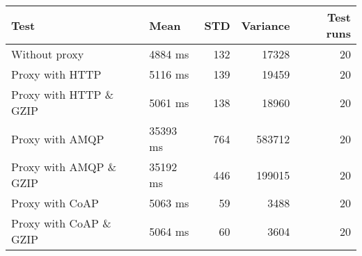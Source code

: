 \begin{tabularx}{\textwidth}{llrrr}
\hline
 Test                   & Mean     &   STD &   Variance &   Test runs \\
\hline
 Without proxy          & 4884 ms  &   132 &      17328 &          20 \\
 Proxy with HTTP        & 5116 ms  &   139 &      19459 &          20 \\
 Proxy with HTTP \& GZIP & 5061 ms  &   138 &      18960 &          20 \\
 Proxy with AMQP        & 35393 ms &   764 &     583712 &          20 \\
 Proxy with AMQP \& GZIP & 35192 ms &   446 &     199015 &          20 \\
 Proxy with CoAP        & 5063 ms  &    59 &       3488 &          20 \\
 Proxy with CoAP \& GZIP & 5064 ms  &    60 &       3604 &          20 \\
\hline
\end{tabularx}